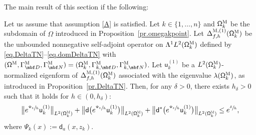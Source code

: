 The main result of this section if the following:

\skpt
\begin{proposition}
\label{pr.Agmon}
Let us assume that assumption \ref{A} is satisfied. Let
$k\in\{1,\ldots,n\}$ and $ \mathsf \Omega_k^{\textsc{M}} $ be the
subdomain of $\Omega$ introduced in Proposition~\ref{pr.omegakpoint}. Let $\Delta_{f,h}^{\textsc{M}, (1)}(\mathsf \Omega_k^{\textsc{M}})$ be the unbounded
nonnegative self-adjoint operator on
$ \Lambda^1L^{2} (\mathsf \Omega_k^{\textsc{M}})$ defined by \eqref{eq.DeltaTN}--\eqref{eq.domDeltaTN} with $(\mathsf \Omega^{\textsc{M}}, \Gamma^{\textsc{M}}_{\mbf D}, \Gamma^{\textsc{M}}_{\mbf N}) = (\mathsf \Omega_k^{\textsc{M}}, \Gamma_{k,\mbf D}^{\textsc{M}}, \Gamma_{k,\mbf N}^{\textsc{M}})$.
Let $\mathsf u^{(1)}_k$ be a $L^2(\mathsf
\Omega_k^{\textsc{M}})$-normalized eigenform of $
\Delta_{f,h}^{\textsc{M},(1)} (\mathsf \Omega_k^{\textsc{M}}) $
associated with the eigenvalue $\lambda(\mathsf
\Omega_k^{\textsc{M}})$, as introduced in Proposition~\ref{pr.DeltaTN}.
Then, for any $\delta>0$, there exists $h_\delta>0$ such that it holds for $h\in (0,h_\delta)$:
\[
\big\|e^{\sfrac{\Psi_k}{ h}} \mathsf u^{(1)}_k\big\|_{ L^{2} (\mathsf \Omega_k^{\textsc{M}})}
+\big\|\mathsf d \bigl(e^{\sfrac{ \Psi_k}{ h}} \mathsf u^{(1)}_k\bigr) \big\|_{ L^{2} (\mathsf \Omega_k^{\textsc{M}})}+\big\|\mathsf d^*\bigl(e^{\sfrac{ \Psi_k}{ h}} \mathsf u^{(1)}_k\bigr) \big\|_{ L^{2} (\mathsf \Omega_k^{\textsc{M}})}
\le e^{\sfrac \delta h},
\]
where $\Psi_k(x):=\mathsf d_a(x,z_k)$.
\end{proposition}

